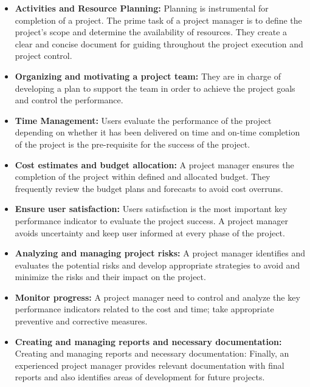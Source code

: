 \begin{itemize}
    \item \textbf{Activities and Resource Planning:}  Planning is instrumental for completion of a project. The prime task of a project manager is to define the project’s scope and determine the availability of resources. They create a clear and concise document for guiding throughout the project execution and project control.

\item \textbf{Organizing and motivating a project team:} They are in charge of developing a plan to support the team in order to achieve the project goals and control the performance.

\item \textbf{Time Management:} Users evaluate the performance of the project depending on whether it has been delivered on time and on-time completion of the project is the pre-requisite for the success of the project.

\item \textbf{Cost estimates and budget allocation:}  A project manager ensures the completion of the project within defined and allocated budget. They frequently review the budget plans and forecasts to avoid cost overruns.

\item \textbf{Ensure user satisfaction:} Users satisfaction is the most important key performance indicator to evaluate the project success. A project manager avoids uncertainty and keep user informed at every phase of the project.

\item \textbf{Analyzing and managing project risks:} A project manager identifies and evaluates the potential risks and develop appropriate strategies to avoid and minimize the risks and their impact on the project. 

\item \textbf{Monitor progress:} A project manager need to control and analyze the key performance indicators related to the cost and time; take appropriate preventive and corrective measures. 

\item \textbf{Creating and managing reports and necessary documentation:} Creating and managing reports and necessary documentation: Finally, an experienced project manager provides relevant documentation with final reports and also identifies areas of development for future projects.
\end{itemize}

